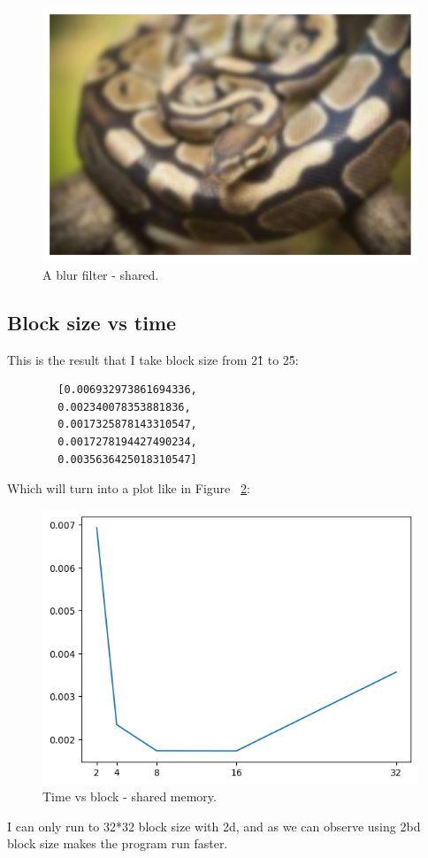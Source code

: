 \documentclass{article}
\begin{document}
	\begin{figure}
		\includegraphics[width=\linewidth]{gpu_python_shared.png}
		\caption{A blur filter - shared.}
		\label{fig:gpu_python_shared}
	\end{figure}
	
	\subsection{Block size vs time}
	This is the result that I take block size from 2\^1 to 2\^5:
	\begin{verbatim}
		[0.006932973861694336,
		0.002340078353881836,
		0.0017325878143310547,
		0.0017278194427490234,
		0.0035636425018310547]
	\end{verbatim}
	Which will turn into a plot like in Figure ~\ref{fig:plot_shared}:
	\begin{figure}
		\includegraphics[width=\linewidth]{plot_shared.png}
		\caption{Time vs block - shared memory.}
		\label{fig:plot_shared}
	\end{figure}
	
	I can only run to 32*32 block size with 2d, and as we can observe using 2bd block size makes the program run faster.
	
\end{document}
